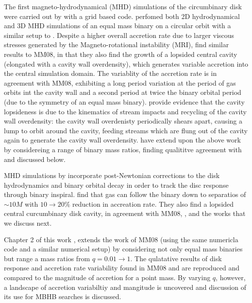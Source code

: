 The first magneto-hydrodynamical (MHD) simulations of the circumbinary disk
were carried out by \cite{ShiKrolik:2012} with a grid based code.
\cite{ShiKrolik:2012}  perfomed both 2D hydrodynamical and 3D MHD simulations
of an equal mass binary on a circular orbit with a similar setup to
\citep{MacFadyen:2008}. Despite a higher overall accretion rate due to larger
viscous stresses generated by the Magneto-rotational instability (MRI),
\cite{ShiKrolik:2012} find similar results to MM08, in that they also find the
growth of a lopsided central cavity (elongated with a cavity wall
overdensity), which generates variable accretion into the central simulation
domain. The variablity of the accretion rate is in agreement with MM08,
exhibiting a long period variation at the period of gas orbits int the cavity
wall and a second period at twice the binary orbital period (due to the
symmetry of an equal mass binary). \cite{ShiKrolik:2012} provide evidence that
the cavity lopsideness is due to the kinematics of stream impacts and
recycling of the cavity wall overdensity: the cavity wall overdenisty
periodically shears apart, causing a lump to orbit around the cavity, feeding
streams which are flung out of the cavity again to generate the cavity wall
overdensity. \cite{ShiKrolik:2015} have extend upon the above work by
considereing a range of binary mass ratios, finding qualititve agreement with
\cite{DHM:2013:MNRAS} and \cite{Farris:2014} discussed below.

MHD simulations by \citep{Noble+2012} incorporate post-Newtonian corrections
to the disk hydrodynamics and binary orbital decay in order to track the disc
response through binary inspiral. \citep{Noble+2012} find that gas can follow
the binary down to separatios of $\sim10M$ with $10 \rightarrow 20\%$
reduction in accreation rate. They also find a lopsided central curcumbinary
disk cavity, in agreement with MM08, \citep{ShiKrolik:2012}, and the works
that we discuss next.

Chapter 2 of this work \citep{DHM:2013:MNRAS}, extends the work of MM08 (using
the same numericla code and a similar numerical setup) by considering not only
equal mass binaries but range a mass ratios from $q=0.01 \rightarrow 1$. The
qulatative results of disk response and accretion rate variability found in
MM08 and \citep{ShiKrolik:2008} are reproduced and compared to the magnitude
of accretion for a point mass. By varying $q$, however, a landscape of
accretion variabiltiy and mangitude is uncovered and discussion of its use for
MBHB searches is discussed.

